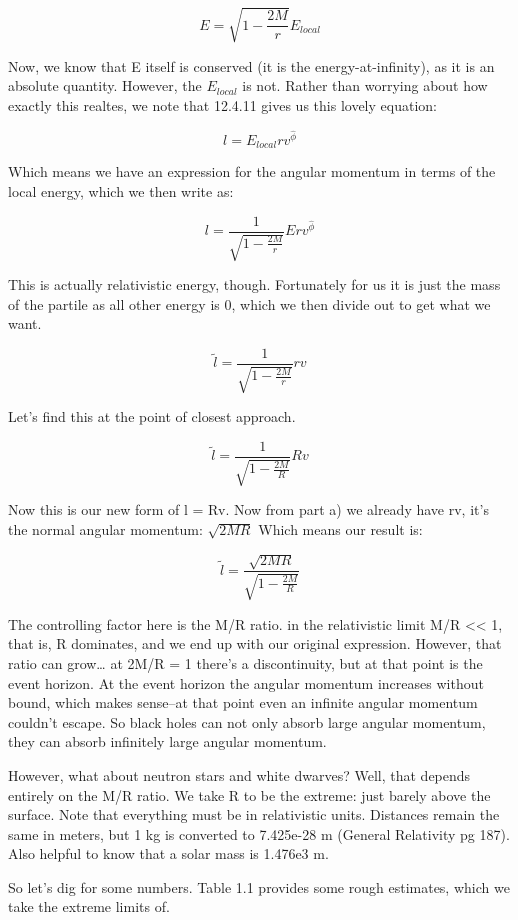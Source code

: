 \documentclass[landscape,letterpaper,10pt,english]{article}
\begin{document}
\[ E = \sqrt{1-\frac{2M}{r}} E_{local}\]

Now, we know that E itself is conserved (it is the energy-at-infinity),
as it is an absolute quantity. However, the \(E_{local}\) is not. Rather
than worrying about how exactly this realtes, we note that 12.4.11 gives
us this lovely equation:

\[ l = E_{local}rv^{\hat\phi} \]

Which means we have an expression for the angular momentum in terms of
the local energy, which we then write as:

\[ l = \frac{1}{\sqrt{1-\frac{2M}{r}}}Erv^{\hat\phi} \]

    This is actually relativistic energy, though. Fortunately for us it is
just the mass of the partile as all other energy is 0, which we then
divide out to get what we want.

\[ \tilde l = \frac{1}{\sqrt{1-\frac{2M}{r}}}rv \]

Let's find this at the point of closest approach.

\[ \tilde l = \frac{1}{\sqrt{1-\frac{2M}{R}}}Rv \]

Now this is our new form of l = Rv. Now from part a) we already have rv,
it's the normal angular momentum: \(\sqrt{2MR}\) Which means our result
is:

\[ \tilde l = \frac{\sqrt{2MR}}{\sqrt{1-\frac{2M}{R}}} \]

    The controlling factor here is the M/R ratio. in the relativistic limit
M/R \textless\textless{} 1, that is, R dominates, and we end up with our
original expression. However, that ratio can grow\ldots{} at 2M/R = 1
there's a discontinuity, but at that point is the event horizon. At the
event horizon the angular momentum increases without bound, which makes
sense--at that point even an infinite angular momentum couldn't escape.
So black holes can not only absorb large angular momentum, they can
absorb infinitely large angular momentum.

However, what about neutron stars and white dwarves? Well, that depends
entirely on the M/R ratio. We take R to be the extreme: just barely
above the surface. Note that everything must be in relativistic units.
Distances remain the same in meters, but 1 kg is converted to 7.425e-28
m (General Relativity pg 187). Also helpful to know that a solar mass is
1.476e3 m.

So let's dig for some numbers. Table 1.1 provides some rough estimates,
which we take the extreme limits of.
\end{document}
